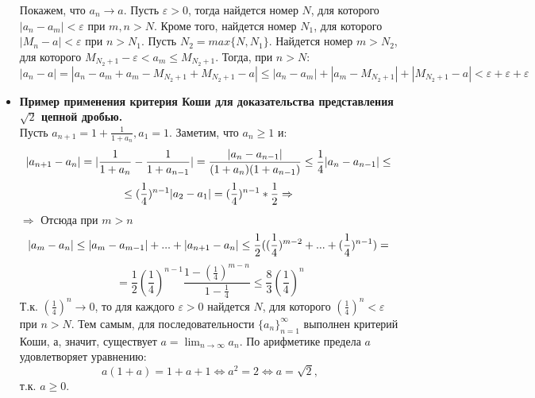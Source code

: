 \documentclass[12pt,a4paper]{article}
\begin{document}
\begin{itemize}
Покажем, что $a_n \longrightarrow a$. Пусть $\varepsilon > 0$, тогда найдется номер $N$, для которого $|a_n - a_m| < \varepsilon$ при $m, n > N$. Кроме того, найдется номер $N_1$, для которого $|M_n - a| < \varepsilon$ при $n > N_1$. Пусть $N_2 = max\{N, N_1\}$. Найдется номер $m > N_2$, для которого $M_{N_2+1} - \varepsilon < a_m \leq M_{N_2+1}$. Тогда, при $n > N$: \\
$|a_n - a| = |a_n - a_m + a_m - M_{N_2+1} + M_{N_2+1} - a| \leq |a_n - a_m| + |a_m - M_{N_2+1}| + |M_{N_2+1} - a| < \varepsilon + \varepsilon + \varepsilon$

\item \textbf{Пример применения критерия Коши для доказательства представления $\sqrt2$ цепной дробью.} \\
Пусть $a_{n+1} = 1 + \frac{1}{1+a_n}, a_1 = 1$. Заметим, что $a_n \geq 1$ и:
\[
|a_{n+1} - a_n| = |\frac{1}{1 + a_n} - \frac{1}{1 + a_{n-1}}| = \frac{|a_n - a_{n-1}|}{(1+a_n)(1+a_{n-1})} \leq \frac{1}{4} |a_n - a_{n-1}| \leq \\
\]
\[
\leq (\frac{1}{4})^{n-1} |a_2 - a_1| = (\frac{1}{4})^{n-1}*\frac{1}{2} \Rightarrow \\
\]
$\Rightarrow$ Отсюда при $m > n$ \\
\[
|a_m - a_n| \leq |a_m - a_{m-1}| + ... + |a_{n+1} - a_n| \leq \frac{1}{2} ((\frac{1}{4})^{m-2} + ... + (\frac{1}{4})^{n-1}) = \\
\]
\[
= \frac{1}{2}(\frac{1}{4})^{n-1} \frac{1 - (\frac{1}{4})^{m - n}}{1 - \frac{1}{4}} \leq \frac{8}{3}(\frac{1}{4})^n
\]
Т.к. $(\frac{1}{4})^n \longrightarrow 0$, то для каждого $\varepsilon > 0$ найдется $N$, для которого $(\frac{1}{4})^n < \varepsilon$ при $n > N$. Тем самым, для последовательности $\{a_n\}_{n=1}^{\infty}$ выполнен критерий Коши, а, значит, существует $a = \lim_{n \to \infty}{a_n}$. По арифметике предела $a$ удовлетворяет уравнению: \[a(1+a) = 1 + a +1 \Leftrightarrow a^2 = 2 \Leftrightarrow a = \sqrt2,\]
т.к. $a \geq 0$.
\end{itemize}
\end{document}
